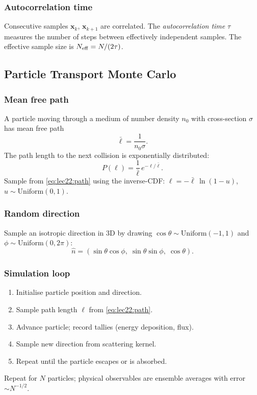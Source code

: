 \subsubsection*{Autocorrelation time}
Consecutive samples $\mathbf{x}_k$, $\mathbf{x}_{k+1}$ are
correlated.  The \emph{autocorrelation time} $\tau$ measures the
number of steps between effectively independent samples.
The effective sample size is $N_{\rm eff} = N / (2\tau)$.


\subsection{Particle Transport Monte Carlo}\label{subsec:lec22:transport}

\subsubsection*{Mean free path}
A particle moving through a medium of number density $n_0$
with cross-section $\sigma$ has mean free path
\begin{equation}
  \bar\ell = \frac{1}{n_0\sigma}.
  \label{eq:lec22:mfp}
\end{equation}
The path length to the next collision is exponentially distributed:
\begin{equation}
  P(\ell) = \frac{1}{\bar\ell}\,e^{-\ell/\bar\ell}.
  \label{eq:lec22:path}
\end{equation}
Sample from \eqref{eq:lec22:path} using the inverse-CDF:
$\ell = -\bar\ell\,\ln(1-u)$, $u\sim\text{Uniform}(0,1)$.

\subsubsection*{Random direction}
Sample an isotropic direction in 3D by drawing
$\cos\theta \sim \text{Uniform}(-1,1)$ and
$\phi \sim \text{Uniform}(0,2\pi)$:
\begin{equation}
  \hat{n} = (\sin\theta\cos\phi,\;\sin\theta\sin\phi,\;\cos\theta).
  \label{eq:lec22:direction}
\end{equation}

\subsubsection*{Simulation loop}
\begin{enumerate}
  \item Initialise particle position and direction.
  \item Sample path length $\ell$ from \eqref{eq:lec22:path}.
  \item Advance particle; record tallies (energy deposition, flux).
  \item Sample new direction from scattering kernel.
  \item Repeat until the particle escapes or is absorbed.
\end{enumerate}
Repeat for $N$ particles; physical observables are ensemble averages
with error $\sim N^{-1/2}$.
